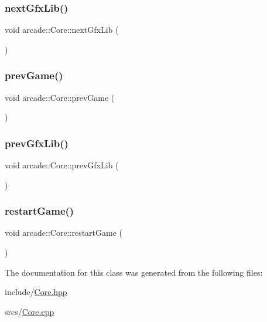 \subsubsection{\texorpdfstring{next\+Gfx\+Lib()}{nextGfxLib()}}
{\footnotesize\ttfamily void arcade\+::\+Core\+::next\+Gfx\+Lib (\begin{DoxyParamCaption}{ }\end{DoxyParamCaption})}

\mbox{\label{classarcade_1_1_core_a60fbdf58db50c1ab65c3f31d02f5d3d3}} 
\subsubsection{\texorpdfstring{prev\+Game()}{prevGame()}}
{\footnotesize\ttfamily void arcade\+::\+Core\+::prev\+Game (\begin{DoxyParamCaption}{ }\end{DoxyParamCaption})}

\mbox{\label{classarcade_1_1_core_a080c95e72cb95b887ca959f1a07a885e}} 
\subsubsection{\texorpdfstring{prev\+Gfx\+Lib()}{prevGfxLib()}}
{\footnotesize\ttfamily void arcade\+::\+Core\+::prev\+Gfx\+Lib (\begin{DoxyParamCaption}{ }\end{DoxyParamCaption})}

\mbox{\label{classarcade_1_1_core_a5393143a3668f07126a6f20c12f0fa9a}} 
\subsubsection{\texorpdfstring{restart\+Game()}{restartGame()}}
{\footnotesize\ttfamily void arcade\+::\+Core\+::restart\+Game (\begin{DoxyParamCaption}{ }\end{DoxyParamCaption})}



The documentation for this class was generated from the following files\+:\begin{DoxyCompactItemize}
\item 
include/\hyperlink{_core_8hpp}{Core.\+hpp}\item 
srcs/\hyperlink{_core_8cpp}{Core.\+cpp}\end{DoxyCompactItemize}
